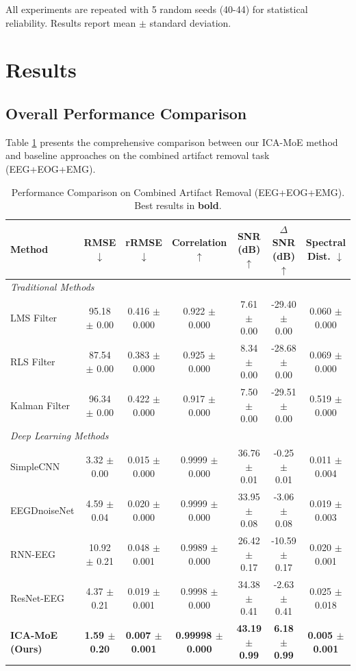 \documentclass[journal]{IEEEtran}
\begin{document}
All experiments are repeated with 5 random seeds (40-44) for statistical reliability. Results report mean $\pm$ standard deviation.

\section{Results}
\label{sec:results}

\subsection{Overall Performance Comparison}

Table \ref{tab:overall_results} presents the comprehensive comparison between our ICA-MoE method and baseline approaches on the combined artifact removal task (EEG+EOG+EMG).

\begin{table}[!t]
\centering
\caption{Performance Comparison on Combined Artifact Removal (EEG+EOG+EMG). Best results in \textbf{bold}.}
\label{tab:overall_results}
\begin{tabular}{lcccccc}
\toprule
\textbf{Method} & \textbf{RMSE} $\downarrow$ & \textbf{rRMSE} $\downarrow$ & \textbf{Correlation} $\uparrow$ & \textbf{SNR (dB)} $\uparrow$ & \textbf{$\Delta$SNR (dB)} $\uparrow$ & \textbf{Spectral Dist.} $\downarrow$ \\
\midrule
\multicolumn{7}{l}{\textit{Traditional Methods}} \\
LMS Filter & 95.18 $\pm$ 0.00 & 0.416 $\pm$ 0.000 & 0.922 $\pm$ 0.000 & 7.61 $\pm$ 0.00 & -29.40 $\pm$ 0.00 & 0.060 $\pm$ 0.000 \\
RLS Filter & 87.54 $\pm$ 0.00 & 0.383 $\pm$ 0.000 & 0.925 $\pm$ 0.000 & 8.34 $\pm$ 0.00 & -28.68 $\pm$ 0.00 & 0.069 $\pm$ 0.000 \\
Kalman Filter & 96.34 $\pm$ 0.00 & 0.422 $\pm$ 0.000 & 0.917 $\pm$ 0.000 & 7.50 $\pm$ 0.00 & -29.51 $\pm$ 0.00 & 0.519 $\pm$ 0.000 \\
\midrule
\multicolumn{7}{l}{\textit{Deep Learning Methods}} \\
SimpleCNN & 3.32 $\pm$ 0.00 & 0.015 $\pm$ 0.000 & 0.9999 $\pm$ 0.000 & 36.76 $\pm$ 0.01 & -0.25 $\pm$ 0.01 & 0.011 $\pm$ 0.004 \\
EEGDnoiseNet & 4.59 $\pm$ 0.04 & 0.020 $\pm$ 0.000 & 0.9999 $\pm$ 0.000 & 33.95 $\pm$ 0.08 & -3.06 $\pm$ 0.08 & 0.019 $\pm$ 0.003 \\
RNN-EEG & 10.92 $\pm$ 0.21 & 0.048 $\pm$ 0.001 & 0.9989 $\pm$ 0.000 & 26.42 $\pm$ 0.17 & -10.59 $\pm$ 0.17 & 0.020 $\pm$ 0.001 \\
ResNet-EEG & 4.37 $\pm$ 0.21 & 0.019 $\pm$ 0.001 & 0.9998 $\pm$ 0.000 & 34.38 $\pm$ 0.41 & -2.63 $\pm$ 0.41 & 0.025 $\pm$ 0.018 \\
\midrule
\textbf{ICA-MoE (Ours)} & \textbf{1.59 $\pm$ 0.20} & \textbf{0.007 $\pm$ 0.001} & \textbf{0.99998 $\pm$ 0.000} & \textbf{43.19 $\pm$ 0.99} & \textbf{6.18 $\pm$ 0.99} & \textbf{0.005 $\pm$ 0.001} \\
\bottomrule
\end{tabular}
\end{table}
\end{document}
